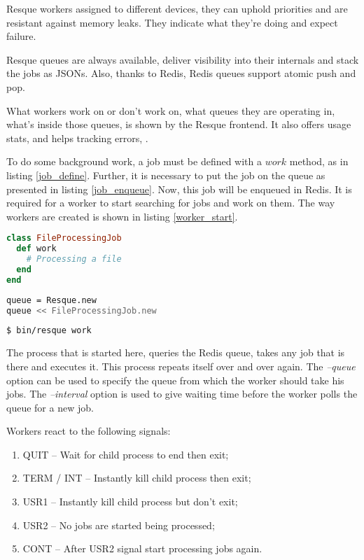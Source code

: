 Resque workers assigned to different devices, they can uphold priorities and are resistant against memory leaks. They indicate what they're doing and expect failure.

Resque queues are always available, deliver visibility into their internals and stack the jobs as JSONs. Also, thanks to Redis, Redis queues support atomic push and pop.

What workers work on or don't work on, what queues they are operating in, what's inside those queues, is shown by the Resque frontend. It also offers usage stats, and helps tracking errors, \cite{resque_readme}.

To do some background work, a job must be defined with a $work$ method, as in listing \ref{job_define}. Further, it is necessary to put the job on the queue as presented in listing \ref{job_enqueue}. Now, this job will be enqueued in Redis. It is required for a worker to start searching for jobs and work on them. The way workers are created is shown in listing \ref{worker_start}.

\begin{lstlisting}[language=Ruby, caption={Defining a job class}, label=job_define]
class FileProcessingJob
  def work
    # Processing a file
  end
end
\end{lstlisting}


\begin{lstlisting}[language=Bash, caption={Enqueue a job}, label=job_enqueue]
queue = Resque.new
queue << FileProcessingJob.new
\end{lstlisting}

\begin{lstlisting}[language=Bash, caption={Create a worker}, label=worker_start]
$ bin/resque work
\end{lstlisting}

The process that is started here, queries the Redis queue, takes any job that is there and executes it. This process repeats itself over and over again. The \textit{--queue} option can be used to specify the queue from which the worker should take his jobs. The \textit{--interval} option is used to give waiting time before the worker polls the queue for a new job.

Workers react to the following signals:
\begin{enumerate}
  \item QUIT -- Wait for child process to end then exit;
  \item TERM / INT -- Instantly kill child process then exit;
  \item USR1 -- Instantly kill child process but don't exit;
  \item USR2 -- No jobs are started being processed;
  \item CONT -- After USR2 signal start processing jobs again.
\end{enumerate}

